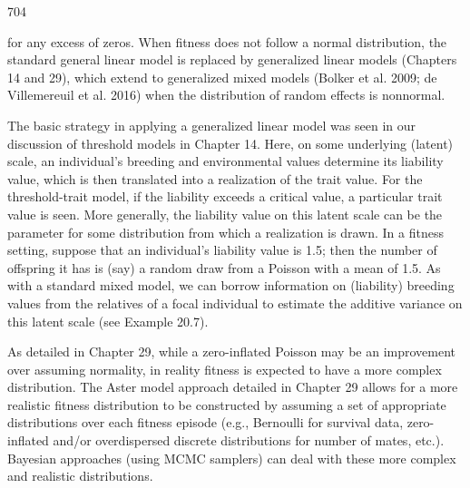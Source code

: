 \documentclass{article}
\begin{document}
704

for any excess of zeros. When fitness does not follow a normal distribution, the standard general linear model is replaced by generalized linear models (Chapters 14 and 29), which extend to generalized mixed models (Bolker et al. 2009; de Villemereuil et al. 2016) when the distribution of random effects is nonnormal.

The basic strategy in applying a generalized linear model was seen in our discussion of threshold models in Chapter 14. Here, on some underlying (latent) scale, an individual's breeding and environmental values determine its liability value, which is then translated into a realization of the trait value. For the threshold-trait model, if the liability exceeds a critical value, a particular trait value is seen. More generally, the liability value on this latent scale can be the parameter for some distribution from which a realization is drawn. In a fitness setting, suppose that an individual's liability value is 1.5; then the number of offspring it has is (say) a random draw from a Poisson with a mean of 1.5. As with a standard mixed model, we can borrow information on (liability) breeding values from the relatives of a focal individual to estimate the additive variance on this latent scale (see Example 20.7).

As detailed in Chapter 29, while a zero-inflated Poisson may be an improvement over assuming normality, in reality fitness is expected to have a more complex distribution. The Aster model approach detailed in Chapter 29 allows for a more realistic fitness distribution to be constructed by assuming a set of appropriate distributions over each fitness episode (e.g., Bernoulli for survival data, zero-inflated and/or overdispersed discrete distributions for number of mates, etc.). Bayesian approaches (using MCMC samplers) can deal with these more complex and realistic distributions.
\end{document}
